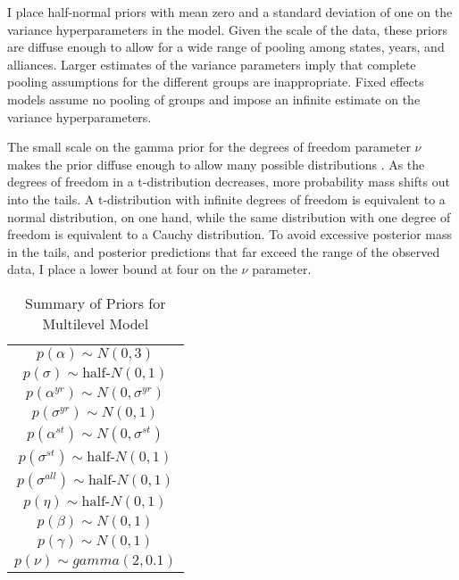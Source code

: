 \documentclass[12pt]{article}
\begin{document}
I place half-normal priors with mean zero and a standard deviation of one on the variance hyperparameters in the model. Given the scale of the data, these priors are diffuse enough to allow for a wide range of pooling among states, years, and alliances. Larger estimates of the variance parameters imply that complete pooling assumptions for the different groups are inappropriate. Fixed effects models assume no pooling of groups and impose an infinite estimate on the variance hyperparameters. 

The small scale on the gamma prior for the degrees of freedom parameter $\nu$ makes the prior diffuse enough to allow many possible distributions \citep{JuarezSteele2010}. As the degrees of freedom in a t-distribution decreases, more probability mass shifts out into the tails. A t-distribution with infinite degrees of freedom is equivalent to a normal distribution, on one hand, while the same distribution with one degree of freedom is equivalent to a Cauchy distribution. To avoid excessive posterior mass in the tails, and posterior predictions that far exceed the range of the observed data, I place a lower bound at four on the $\nu$ parameter. 


\begin{table} %

 \begin{center}
\begin{tabular}{c} 
$ p(\alpha) \sim N(0, 3)$  \\
$ p(\sigma) \sim \mbox{half-}N(0, 1) $ \\
$ p(\alpha^{yr}) \sim N(0, \sigma^{yr}) $ \\ 
$ p(\sigma^{yr}) \sim N(0, 1) $ \\
$ p(\alpha^{st}) \sim N(0, \sigma^{st}) $ \\ 
$ p(\sigma^{st}) \sim \mbox{half-}N(0, 1) $ \\ 
$ p(\sigma^{all}) \sim \mbox{half-}N(0, 1) $ \\
$ p(\eta) \sim \mbox{half-}N(0, 1) $ \\
$ p(\beta) \sim N(0, 1) $ \\
$ p(\gamma) \sim N(0, 1) $ \\ 
$ p(\nu) \sim gamma(2, 0.1)$ 
\end{tabular} 
\end{center} 

\caption{Summary of Priors for Multilevel Model}
\label{tab:priors}
\end{table} 
\end{document}
